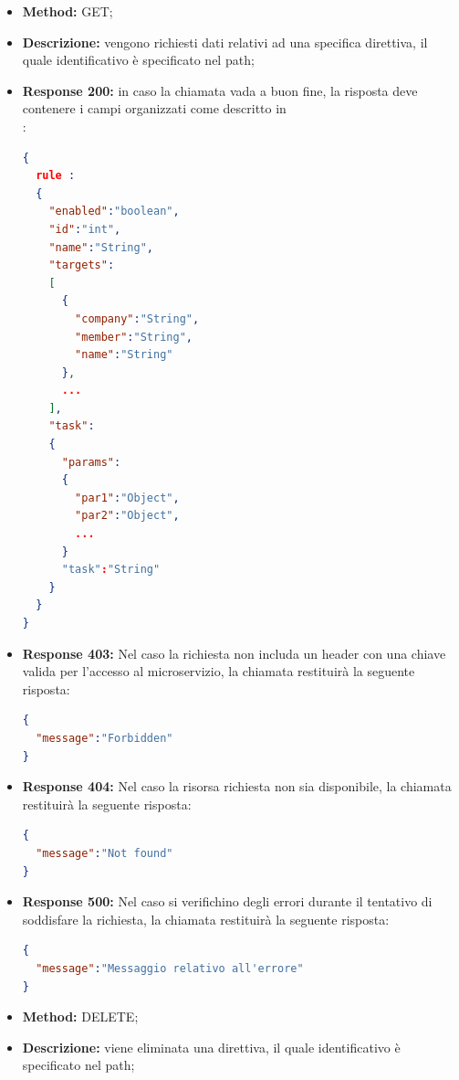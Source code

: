 \begin{itemize}
\begin{itemize}
\item \textbf{Method:} GET;
\item \textbf{Descrizione:} vengono richiesti dati relativi ad una specifica direttiva, il quale identificativo è specificato nel path;
\item \textbf{Response 200:} in caso la chiamata vada a buon fine, la risposta deve contenere i campi organizzati come descritto in \\:
\begin{lstlisting}[language=json,firstnumber=1]
{
  rule :
  {
    "enabled":"boolean",
    "id":"int",
    "name":"String",
    "targets":
    [
      {
        "company":"String",
        "member":"String",
        "name":"String"
      },
      ...
    ],
    "task":
    {
      "params":
      {
        "par1":"Object",
        "par2":"Object",
        ...
      }
      "task":"String"
    }
  }
}
\end{lstlisting}
\item \textbf{Response 403:} Nel caso la richiesta non includa un header  con una chiave valida per l'accesso al microservizio, la chiamata restituirà la seguente risposta:
\begin{lstlisting}[language=json,firstnumber=1]
{
  "message":"Forbidden"
}
\end{lstlisting}

\item \textbf{Response 404:} Nel caso la risorsa richiesta non sia disponibile, la chiamata restituirà la seguente risposta:
\begin{lstlisting}[language=json,firstnumber=1]
{
  "message":"Not found"
}
\end{lstlisting}
\item \textbf{Response 500:} Nel caso si verifichino degli errori durante il tentativo di soddisfare la richiesta, la chiamata restituirà la seguente risposta:
\begin{lstlisting}[language=json,firstnumber=1]
{
  "message":"Messaggio relativo all'errore"
}
\end{lstlisting}
\end{itemize}

\begin{itemize}
\item \textbf{Method:} DELETE;
\item \textbf{Descrizione:} viene eliminata una direttiva, il quale identificativo è specificato nel path;


\end{itemize}
\end{itemize}
